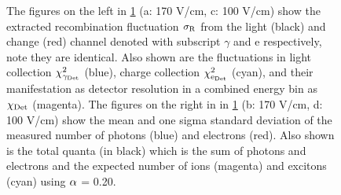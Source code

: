 \begin{figure}[h!]
\hfill
{}

\caption{The figures on the left in \ref{fig:R_Flucs_Quanta} (a: 170 V/cm, c: 100 V/cm) show the extracted recombination fluctuation $\rm \sigma_R$ from the light (black) and change (red) channel denoted with subscript $\gamma$ and e respectively, note they are identical. Also shown are the fluctuations in light collection $\rm \chi_{\gamma_{Det}}^2$ (blue), charge collection $\rm \chi_{e_{Det}}^2$ (cyan), and their manifestation as detector resolution in a combined energy bin as $\rm \chi_{Det}$ (magenta). The figures on the right in in \ref{fig:R_Flucs_Quanta} (b: 170 V/cm, d: 100 V/cm) show the mean and one sigma standard deviation of the measured number of photons (blue) and electrons (red). Also shown is the total quanta (in black) which is the sum of photons and electrons and the expected number of ions (magenta) and excitons (cyan) using $\rm \alpha$ = 0.20.}
\label{fig:R_Flucs_Quanta}
\end{figure}
\renewcommand{\baselinestretch}{2}
\small\normalsize

